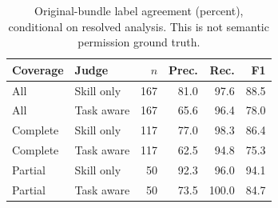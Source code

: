 \begin{table}[t]
\caption{Original-bundle label agreement (percent), conditional on resolved analysis. This is not semantic permission ground truth.}
\label{tab:static}
\centering\small
\begin{tabular}{llrrrr}
\toprule
Coverage & Judge & $n$ & Prec. & Rec. & F1 \\
\midrule
All & Skill only & 167 & 81.0 & 97.6 & 88.5 \\
All & Task aware & 167 & 65.6 & 96.4 & 78.0 \\
Complete & Skill only & 117 & 77.0 & 98.3 & 86.4 \\
Complete & Task aware & 117 & 62.5 & 94.8 & 75.3 \\
Partial & Skill only & 50 & 92.3 & 96.0 & 94.1 \\
Partial & Task aware & 50 & 73.5 & 100.0 & 84.7 \\
\bottomrule
\end{tabular}
\end{table}